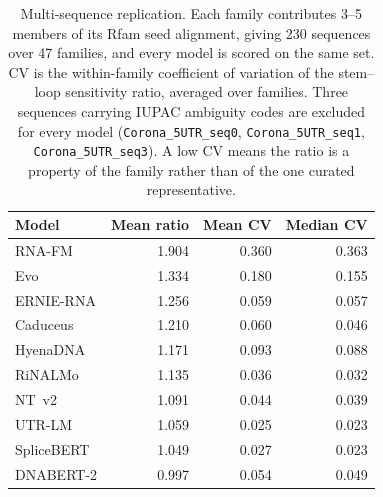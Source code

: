 \begin{table}[htbp]
\centering
\caption{Multi-sequence replication. Each family contributes 3--5 members of its Rfam seed alignment, giving 230 sequences over 47 families, and every model is scored on the same set. CV is the within-family coefficient of variation of the stem--loop sensitivity ratio, averaged over families. Three sequences carrying IUPAC ambiguity codes are excluded for every model (\texttt{Corona\_5UTR\_seq0}, \texttt{Corona\_5UTR\_seq1}, \texttt{Corona\_5UTR\_seq3}). A low CV means the ratio is a property of the family rather than of the one curated representative.}
\label{tab:multiseq}
\begin{tabular}{@{}lrrr@{}}
\toprule
\textbf{Model} & \textbf{Mean ratio} & \textbf{Mean CV} & \textbf{Median CV} \\
\midrule
RNA-FM & 1.904 & 0.360 & 0.363 \\
Evo & 1.334 & 0.180 & 0.155 \\
ERNIE-RNA & 1.256 & 0.059 & 0.057 \\
Caduceus & 1.210 & 0.060 & 0.046 \\
HyenaDNA & 1.171 & 0.093 & 0.088 \\
RiNALMo & 1.135 & 0.036 & 0.032 \\
NT~v2 & 1.091 & 0.044 & 0.039 \\
UTR-LM & 1.059 & 0.025 & 0.023 \\
SpliceBERT & 1.049 & 0.027 & 0.023 \\
DNABERT-2 & 0.997 & 0.054 & 0.049 \\
\bottomrule
\end{tabular}
\end{table}
